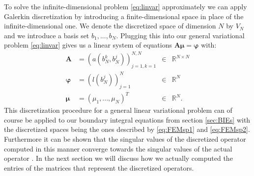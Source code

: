 \documentclass[a4paper, oneside]{discothesis}
\begin{document}
To solve the infinite-dimensional problem \ref{eq:linvar} approximately we can apply Galerkin discretization by introducing a finite-dimensional space in place of the infinite-dimensional one.
We denote the discretized space of dimension $N$ by $V_N$ and we introduce a basis set ${b_1,...,b_N}$.
Plugging this into our general variational problem \ref{eq:linvar} gives us a linear system of equations $\mathbf{A}\boldsymbol{\mu} = \boldsymbol{\varphi}$ with:
\begin{align}
	\mathbf{A} &= \left(a(b_N^k,b_{N}^j) \right)_{j=1,k=1}^{N,N} &\in& \mathbb{R}^{N\times N} \\
	\boldsymbol{\varphi} &= \left( l(b_N^j)\right)_{j=1}^{N} &\in& \mathbb{R}^{N} \\
	\boldsymbol{\mu} &= (\mu_1,...,\mu_N)^T &\in& \mathbb{R}^N. \label{mu}
\end{align}
This discretization procedure for a general linear variational problem can of course be applied to our boundary integral equations from section \ref{sec:BIEs} with the discretized spaces being the ones described by \ref{eq:FEMsp1} and \ref{eq:FEMsp2}.
Furthermore it can be shown that the singular values of the discretized operator computed in this manner converge towards the singular values of the actual operator \cite{svdap}.
In the next section we will discuss how we actually computed the entries of the matrices that represent the discretized operators.
\end{document}
